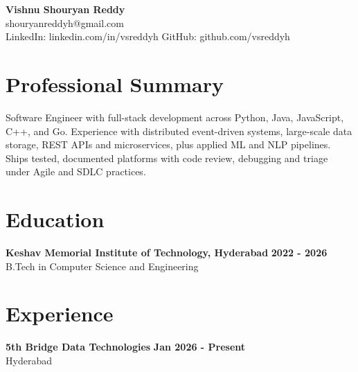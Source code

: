 \documentclass[a4paper,11pt]{article}
\newcommand{\resumeSubheading}[4]{%
  \textbf{#1} \hfill \textbf{#2} \\
{#3} \hfill {#4}
}
\begin{document}
\pagestyle{empty}
\raggedbottom
\addtolength{\textheight}{2\baselineskip}
\small

\begin{center}
  {\LARGE \textbf{Vishnu Shouryan Reddy}}\\[0.3em]
  shouryanreddyh@gmail.com \\[0.3em]
  LinkedIn: linkedin.com/in/vsreddyh \textbar{} GitHub: github.com/vsreddyh
\end{center}
\vspace{-0.8em}

\section*{Professional Summary}

Software Engineer with full-stack development across Python, Java, JavaScript, C++, and Go. Experience with distributed event-driven systems, large-scale data storage, REST APIs and microservices, plus applied ML and NLP pipelines. Ships tested, documented platforms with code review, debugging and triage under Agile and SDLC practices.

\section*{Education}

\resumeSubheading
{Keshav Memorial Institute of Technology, Hyderabad}{2022 - 2026}
{B.Tech in Computer Science and Engineering}{}


\section*{Experience}

\resumeSubheading
{5th Bridge Data Technologies}{Jan 2026 - Present}
{Hyderabad}{}
\end{document}
